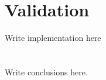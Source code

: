 \documentclass[12pt,a4paper,openright,twoside]{book}
\begin{document}
\chapter{Validation} %
\label{chap:validation}

Write implementation here

\chapter{\conclusionsname}
\label{chap:conclusions}

Write conclusions here.





\end{document}
